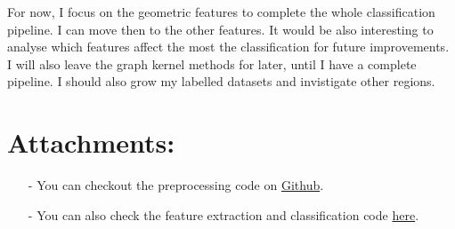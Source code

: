 \documentclass[a4paper, 11pt]{article}
\begin{document}
	For now, I focus on the geometric features to complete the whole classification
	pipeline. I can move then to the other features. It would be also interesting
	to analyse which features affect the most the classification for future improvements.
	I will also leave the graph kernel methods for later, until I have a complete
	pipeline. I should also grow my labelled datasets and invistigate other regions.


	\section*{Attachments:}
	\begin{itemize}
		\item[-] You can checkout the preprocessing code on
		\href{https://github.com/ethiy/proj.city}{Github}.
		\item[-] You can also check the feature extraction and classification code
		\href{https://github.com/ethiy/qualcity}{here}.
	\end{itemize}
\end{document}
